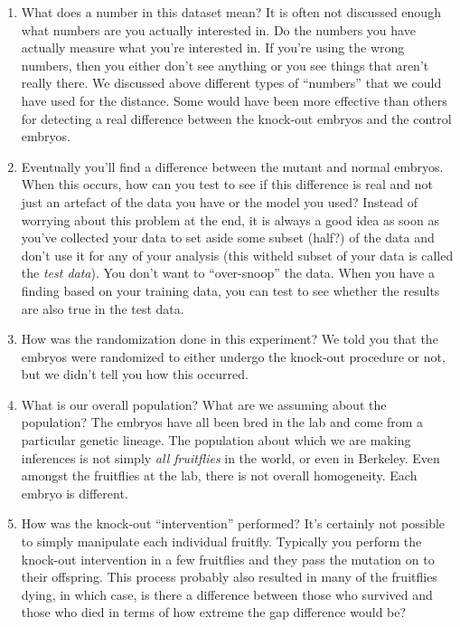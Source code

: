 \begin{enumerate} 
\item What does a number in this dataset mean? It is often not discussed enough what numbers are you actually interested in. Do the numbers you have actually measure what you're interested in. If you're using the wrong numbers, then you either don't see anything or you see things that aren't really there. We discussed above different types of ``numbers'' that we could have used for the distance. Some would have been more effective than others for detecting a real difference between the knock-out embryos and the control embryos.
\item Eventually you'll find a difference between the mutant and normal embryos. When this occurs, how can you test to see if this difference is real and not just an artefact of the data you have or the model you used? Instead of worrying about this problem at the end, it is always a good idea as soon as you've collected your data to set aside some subset (half?) of the data and don't use it for any of your analysis (this witheld subset of your data is called the \emph{test data}). You don't want to ``over-snoop'' the data. When you have a finding based on your training data, you can test to see whether the results are also true in the test data.
\item How was the randomization done in this experiment? We told you that the embryos were randomized to either undergo the knock-out procedure or not, but we didn't tell you how this occurred. 
\item What is our overall population? What are we assuming about the population? The embryos have all been bred in the lab and come from a particular genetic lineage. The population about which we are making inferences is not simply \emph{all fruitflies} in the world, or even in Berkeley. Even amongst the fruitflies at the lab, there is not overall homogeneity. Each embryo is different.
\item How was the knock-out ``intervention'' performed? It's certainly not possible to simply manipulate each individual fruitfly. Typically you perform the knock-out intervention in a few fruitflies and they pass the mutation on to their offspring. This process probably also resulted in many of the fruitflies dying, in which case, is there a difference between those who survived and those who died in terms of how extreme the gap difference would be?
\end{enumerate}
 
 
 
